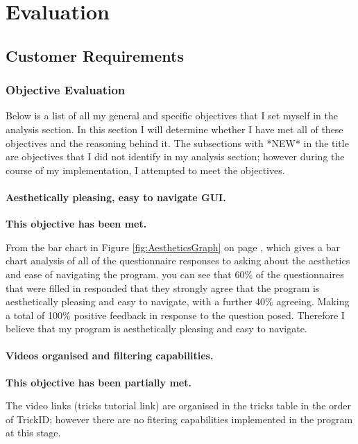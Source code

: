 \chapter{Evaluation}

\section{Customer Requirements}


\subsection{Objective Evaluation}

Below is a list of all my general and specific objectives that I set myself in the analysis section. In this section I will determine whether I have met all of these objectives and the reasoning behind it. The subsections with *NEW* in the title are objectives that I did not identify in my analysis section; however during the course of my implementation, I attempted to meet the objectives. 

\subsubsection{Aesthetically pleasing, easy to navigate GUI.} 

\textbf{This objective has been met.}

From the bar chart in Figure \ref{fig:AestheticsGraph} on page \pageref{fig:AestheticsGraph}, which gives a bar chart analysis of all of the questionnaire responses to asking about the aesthetics and ease of navigating the program. you can see that 60\% of the questionnaires that were filled in responded that they strongly agree that the program is aesthetically pleasing and easy to navigate, with a further 40\% agreeing. Making a total of 100\% positive feedback in response to the question posed. Therefore I believe that my program is aesthetically pleasing and easy to navigate.




\subsubsection{Videos organised and filtering capabilities.}

\textbf{This objective has been partially met.}

The video links (tricks tutorial link) are organised in the tricks table in the order of TrickID; however there are no fitering capabilities implemented in the program at this stage. 


